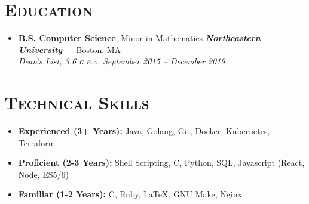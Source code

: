 \documentclass{article}
\begin{document}
\begin{itemize}[label={},leftmargin=*]
\end{itemize}

\section*{\textsc{Education}}
\begin{itemize}[label={},leftmargin=*]
  \item \textbf{B.S. Computer Science}, Minor in Mathematics \hfill \textit{\textbf{Northeastern University}} --- Boston, MA \\
  \em{Dean's List}, 3.6 \textsc{g.p.a.}  \hfill \em{\textit{September 2015 -- December 2019}}
\end{itemize}

\section*{\textsc{Technical Skills}}
\begin{itemize}[label={},leftmargin=*]
  \item \textbf{Experienced (3+ Years):} Java, Golang, Git, Docker, Kubernetes, Terraform
  \item \textbf{Proficient (2-3 Years):} Shell Scripting, C, Python, SQL, Javascript (React, Node, ES5/6)
  \item \textbf{Familiar (1-2 Years):} C, Ruby, LaTeX, GNU Make, Nginx
\end{itemize}
\end{document}
